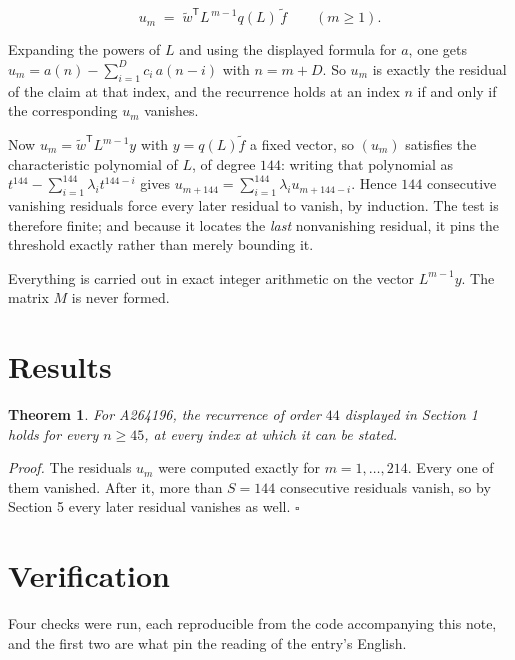 \documentclass[11pt]{article}
\newtheorem{theorem}{Theorem}
\theoremstyle{definition}
\begin{document}
\[u_m \;=\; \tilde w^{\mathsf T} L^{\,m-1} q(L)\,\tilde f \qquad (m \ge 1).\]

Expanding the powers of $L$ and using the displayed formula for $a$, one gets $u_m = a(n) - \sum_{i=1}^{D} c_i\,a(n-i)$ with $n = m + D$. So $u_m$ is exactly the residual of the claim at that index, and the recurrence holds at an index $n$ if and only if the corresponding $u_m$ vanishes.

Now $u_m = \tilde w^{\mathsf T} L^{m-1} y$ with $y = q(L)\tilde f$ a fixed vector, so $(u_m)$ satisfies the characteristic polynomial of $L$, of degree $144$: writing that polynomial as $t^{144} - \sum_{i=1}^{144} \lambda_i t^{144-i}$ gives $u_{m+144} = \sum_{i=1}^{144} \lambda_i u_{m+144-i}$. Hence $144$ consecutive vanishing residuals force every later residual to vanish, by induction. The test is therefore finite; and because it locates the {\itshape last} nonvanishing residual, it pins the threshold exactly rather than merely bounding it.

Everything is carried out in exact integer arithmetic on the vector $L^{m-1}y$. The matrix $M$ is never formed.

\section{Results}

\begin{theorem} For A264196, the recurrence of order $44$ displayed in Section 1 holds for every $n \ge 45$, at every index at which it can be stated.\end{theorem}

{\itshape Proof.} The residuals $u_m$ were computed exactly for $m = 1,\dots,214$. Every one of them vanished. After it, more than $S = 144$ consecutive residuals vanish, so by Section 5 every later residual vanishes as well. $\square$

\section{Verification}

Four checks were run, each reproducible from the code accompanying this note, and the first two are what pin the reading of the entry's English.
\end{document}
